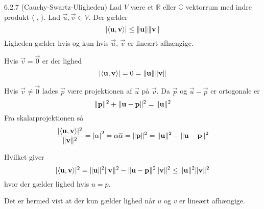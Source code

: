 %
%

\begin{saetning}{6.2.7 (Cauchy-Swartz-Uligheden)}
	Lad $V$ være et $\mathbb{R}$ eller $\mathbb{C}$ vektorrum med indre produkt
	$\langle$ , $\rangle$. Lad $\vec{u}, \vec{v} \in V$. Der gælder
	\[
		\lvert \langle \mathbf{u}, \mathbf{v} \rangle \rvert \leq \lVert\mathbf{u}\rVert\lVert
		\mathbf{v}\rVert
	\]
	Ligheden gælder hvis og kun hvis $\vec{u}$, $\vec{v}$ er lineært afhængige.
\end{saetning}

\begin{bevis}
	Hvis $\vec{v}=\vec{0}$ er der lighed
	\[
		\lvert \langle \mathbf{u}, \mathbf{v} \rangle \rvert = 0 = \lVert\mathbf{u}\rVert
		\lVert\mathbf{v}\rVert
	\]
	
	\noindent Hvis $\vec{v} \not= \vec{0}$ lades $\vec{p}$ være projektionen af $\vec{u}$
	på $\vec{v}$. Da $\vec{p}$ og $\vec{u} - \vec{p}$ er ortogonale er
	\[
		\lVert\mathbf{p}\rVert^2 + \lVert\mathbf{u} - \mathbf{p}\rVert^2 = \lVert\mathbf{u}\rVert^2
	\]
	Fra skalarprojektionen så
	\[
		\frac{\lvert \langle \mathbf{u}, \mathbf{v} \rangle \rvert^2}{\lVert\mathbf{v}\rVert^2}
		= {\lvert \alpha \rvert}^2 = \alpha \overline\alpha = \lVert\mathbf{p}\rVert^2
		= \lVert\mathbf{u}\rVert^2 - \lVert\mathbf{u} - \mathbf{p}\rVert^2
	\]
	\begin{center}
	\end{center}
	Hvilket giver
	\[
		\lvert \langle \mathbf{u}, \mathbf{v} \rangle \rvert^2 = \lVert\mathbf{u}\rVert^2
		\lVert\mathbf{v}\rVert^2 - \lVert\mathbf{u} - \mathbf{p}\rVert^2\lVert\mathbf{v}\rVert^2 \leq
		\lVert\mathbf{u}\rVert^2\lVert\mathbf{v}\rVert^2
	\]
	hvor der gælder lighed hvis $u=p$.

	Det er hermed vist at der kun gælder lighed når $u$ og $v$ er lineært
	afhængige.
\end{bevis}
